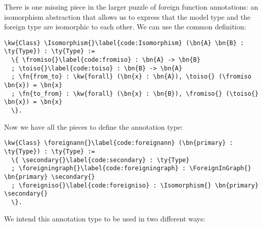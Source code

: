 There is one missing piece in the larger puzzle of foreign function annotations: an isomorphism abstraction that allows us to express that the model type and the foreign type are isomorphic to each other. We can use the common definition:

\newcommand{\Isomorphism}{\hyperref[code:Isomorphism]{\ty{Isomorphism}}}
\newcommand{\fromiso}{\hyperref[code:fromiso]{\fn{from}}}
\newcommand{\toiso}{\hyperref[code:toiso]{\fn{to}}}
\begin{Verbatim}
\kw{Class} \Isomorphism{}\label{code:Isomorphism} (\bn{A} \bn{B} : \ty{Type}) : \ty{Type} :=
  \{ \fromiso{}\label{code:fromiso} : \bn{A} -> \bn{B}
  ; \toiso{}\label{code:toiso} : \bn{B} -> \bn{A}
  ; \fn{from_to} : \kw{forall} (\bn{x} : \bn{A}), \toiso{} (\fromiso \bn{x}) = \bn{x}
  ; \fn{to_from} : \kw{forall} (\bn{x} : \bn{B}), \fromiso{} (\toiso{} \bn{x}) = \bn{x}
  \}.
\end{Verbatim}

\newpage
Now we have all the pieces to define the annotation type:

\newcommand{\foreignann}{\hyperref[code:foreignann]{\ty{foreign\_\linebreak[0]ann}}}
\newcommand{\foreigningraph}{\hyperref[code:foreigningraph]{\fn{foreign\_\linebreak[0]in\_\linebreak[0]graph}}}
\newcommand{\secondary}{\hyperref[code:secondary]{\fn{secondary}}}
\newcommand{\foreigniso}{\hyperref[code:foreigniso]{\fn{foreign\_\linebreak[0]iso}}}
\begin{Verbatim}
\kw{Class} \foreignann{}\label{code:foreignann} (\bn{primary} : \ty{Type}) : \ty{Type} :=
  \{ \secondary{}\label{code:secondary} : \ty{Type}
  ; \foreigningraph{}\label{code:foreigningraph} : \ForeignInGraph{} \bn{primary} \secondary{}
  ; \foreigniso{}\label{code:foreigniso} : \Isomorphism{} \bn{primary} \secondary{}
  \}.
\end{Verbatim}


\newcommand{\transparent}{\hyperref[code:transparent]{\fn{transparent}}}
\newcommand{\opaque}{\hyperref[code:opaque]{\fn{opaque}}}


We intend this annotation type to be used in two different ways:


